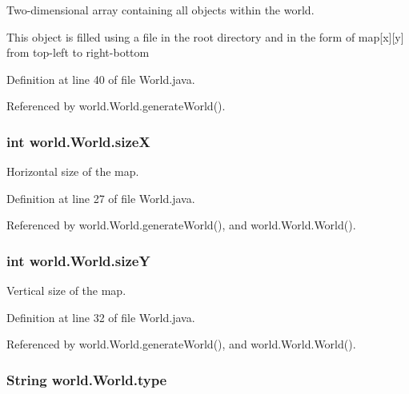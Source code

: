Two-\/dimensional array containing all objects within the world. 

This object is filled using a file in the root directory and in the form of map\mbox{[}x\mbox{]}\mbox{[}y\mbox{]} from top-\/left to right-\/bottom 

Definition at line 40 of file World.\-java.



Referenced by world.\-World.\-generate\-World().

\hypertarget{classworld_1_1_world_ab2ca92c9d2a56f6fa1872dc6cf0f4ab3}{
\subsubsection[{size\-X}]{\setlength{\rightskip}{0pt plus 5cm}int world.\-World.\-size\-X\hspace{0.3cm}{\ttfamily [protected]}}}\label{classworld_1_1_world_ab2ca92c9d2a56f6fa1872dc6cf0f4ab3}


Horizontal size of the map. 



Definition at line 27 of file World.\-java.



Referenced by world.\-World.\-generate\-World(), and world.\-World.\-World().

\hypertarget{classworld_1_1_world_a3a110ad1276dc7dfa6bc47d9a663ec5e}{
\subsubsection[{size\-Y}]{\setlength{\rightskip}{0pt plus 5cm}int world.\-World.\-size\-Y\hspace{0.3cm}{\ttfamily [protected]}}}\label{classworld_1_1_world_a3a110ad1276dc7dfa6bc47d9a663ec5e}


Vertical size of the map. 



Definition at line 32 of file World.\-java.



Referenced by world.\-World.\-generate\-World(), and world.\-World.\-World().

\hypertarget{classworld_1_1_world_a008564127f7e69c09224a84ca7081893}{
\subsubsection[{type}]{\setlength{\rightskip}{0pt plus 5cm}String world.\-World.\-type\hspace{0.3cm}{\ttfamily [protected]}}}\label{classworld_1_1_world_a008564127f7e69c09224a84ca7081893}


